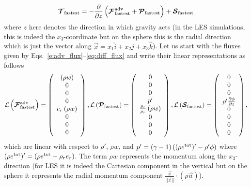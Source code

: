 \documentclass{article}
\begin{document}
{\[
 \boldsymbol{{\mathcal{T}}}_{\mathrm{fastest}}=- \frac{\partial }{\partial z} \left( \boldsymbol{{\mathcal{F}}}^{\mathrm{adv}}_{\mathrm{fastest}} + \boldsymbol{{\mathcal{P}}}_{\mathrm{fastest}} \right) + \boldsymbol{{\mathcal{S}}}_{\mathrm{fastest}}
 \]
 where $z$ here denotes the direction in which gravity acts (in the LES simulations, this is indeed the $x_{3}$-coordinate but on the sphere this is the radial direction which is just the vector along $\vec{x}=x_{1} \hat{i} + x_{2} \hat{j} + x_{3} \hat{k}$).  Let us start with the fluxes given by Eqs.\ \eqref{e:adv_flux}--\eqref{eq:diff_flux} and write their linear representations as follows
 \begin{equation}
 \mathcal{L} \left( \boldsymbol{{\mathcal{F}}}^{\mathrm{adv}}_{\mathrm{fastest}} \right)=\left( \begin{array}{c}
 \left( \rho w \right) \\
 0 \\
 0 \\
 0 \\
 e_r \left( \rho w \right) \\
0 \\
0 \\
0
\end{array}
\right), 
\mathcal{L} \left( \boldsymbol{{\mathcal{P}}}_{\mathrm{fastest}} \right) = \left( \begin{array}{c}
0 \\
0 \\
0 \\
p' \\
\frac{p_r}{\rho_r} \left( \rho w \right) \\
0 \\
0 \\
0 
\end{array}
\right),
\mathcal{L} \left( \boldsymbol{{\mathcal{S}}}_{\mathrm{fastest}} \right) = \left( \begin{array}{c}
0 \\
0 \\
0 \\
\rho' \frac{\partial \phi}{\partial z} \\
0 \\
0 \\
0 \\
0 
\end{array}
\right),
\label{eq:fluxes_linear_1d}
\end{equation}
which are linear with respect to $\rho'$, $\rho w$, and 
$p'=(\gamma-1)\left((\rho e^{\mathrm{tot}})' - \rho' \phi\right)$ where
$(\rho e^{\mathrm{tot}})'=(\rho e^{\mathrm{tot}} - \rho_r e_r)$.  The term $\rho w$ represents the momentum along the $x_{3}$-direction (for LES it is indeed the Cartesian component in the vertical but on the sphere it represents the radial momentum component $\frac{\vec{x}}{||\vec{x}||} \cdot \left(\rho \vec{u}\right)$).

}
\end{document}
